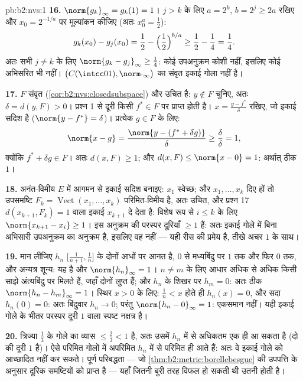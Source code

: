 \begin{solution}{pb:b2:nvs:1}
\textbf{16.} $\norm{g_k}_\infty = g_k(1) = 1$। $j > k$ के लिए $a = 2^k$, $b = 2^j \geq 2a$ रखिए और $x_0 = 2^{-1/a}$ पर मूल्यांकन कीजिए
(अतः $x_0^a = \frac12$):
\[
g_k(x_0) - g_j(x_0) = \frac12 - \Bigl(\frac12\Bigr)^{b/a}
\geq \frac12 - \frac14 = \frac14 .
\]
अतः सभी $j \neq k$ के लिए $\norm{g_k - g_j}_\infty \geq \frac14$: कोई उपअनुक्रम कोशी नहीं, इसलिए कोई अभिसरित भी
नहीं। $\bigl(C(\intcc01), \norm\cdot_\infty\bigr)$ का संवृत इकाई गोला  नहीं है।

\textbf{17.} $F$ संवृत (\cref{cor:b2:nvs:closedsubspace}) और उचित है: $y \notin F$ चुनिए, अतः $\delta = d(y, F) > 0$। प्रश्न 1
से दूरी किसी $f^* \in F$ पर प्राप्त होती है। $x
= \frac{y - f^*}{\delta}$ रखिए, जो इकाई सदिश है ($\norm{y - f^*} =
\delta$)।
प्रत्येक $g \in F$ के लिए:
\[
\norm{x - g} = \frac{\norm{y - (f^* + \delta g)}}{\delta}
\geq \frac{\delta}{\delta} = 1 ,
\]
क्योंकि $f^* + \delta g \in F$। अतः $d(x, F) \geq 1$; और $d(x,
F) \leq \norm{x - 0} = 1$: अर्थात् ठीक $1$।

\textbf{18.} अनंत-विमीय $E$ में आगमन से इकाई सदिश बनाइए: $x_1$ स्वेच्छ;
और $x_1, \dots, x_k$ दिए हों तो उपसमष्टि $F_k = \operatorname{Vect}(x_1, \dots, x_k)$ परिमित-विमीय है, अतः उचित, और प्रश्न 17
$d(x_{k+1}, F_k) = 1$ वाला इकाई $x_{k+1}$ दे देता है: विशेष रूप से $i \leq k$ के लिए $\norm{x_{k+1} - x_i} \geq 1$। इस अनुक्रम
की परस्पर दूरियाँ $\geq 1$ हैं: अतः इकाई गोले में बिना अभिसारी उपअनुक्रम का
अनुक्रम है, इसलिए वह  नहीं --- यही रीस की प्रमेय है, तीखे अचर $1$
के साथ।

\textbf{19.} मान लीजिए $h_n$ $\bigl[\frac1{n+1}, \frac1n\bigr]$ के दोनों आधों पर आनत है, $0$ से मध्यबिंदु
पर $1$ तक और फिर $0$ तक, और अन्यत्र शून्य: यह  है और $\norm{h_n}_\infty = 1$। $n \neq m$ के
लिए आधार अधिक से अधिक किसी साझे अंत्यबिंदु पर मिलते हैं, जहाँ दोनों
लुप्त हैं; और $h_n$ के शिखर पर $h_m = 0$: अतः ठीक $\norm{h_n - h_m}_\infty = 1$। स्थिर $x > 0$ के लिए: $\frac1n < x$
होते ही $h_n(x) = 0$, और सदा $h_n(0) = 0$: अतः बिंदुवार $h_n \to 0$; परंतु $\norm{h_n - 0}_\infty = 1$: एकसमान नहीं।
यही इकाई गोले के भीतर परस्पर दूरी $1$ वाला स्पष्ट नक्षत्र है।

\textbf{20.} त्रिज्या $\frac13$ के गोले का व्यास $\leq
\frac23 < 1$ है, अतः उसमें $h_n$ में से
अधिकतम एक ही आ सकता है (दो की दूरी $1$ है)। ऐसे परिमित गोलों में
अपरिमित $h_n$ में से परिमित ही आते हैं: अतः वे इकाई गोले को आच्छादित नहीं
कर सकते। पूर्ण परिबद्धता --- जो \cref{thm:b2:metric:borellebesgue} की उपपत्ति के अनुसार  दूरिक
समष्टियों को प्राप्त है --- यहाँ जितनी बुरी तरह विफल हो सकती थी उतनी
होती है।


\end{solution}
